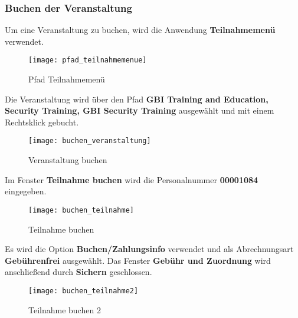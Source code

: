 \subsubsection{Buchen der Veranstaltung}
Um eine Veranstaltung zu buchen, wird die Anwendung \textbf{Teilnahmemenü} verwendet.
\begin{figure}[H]
	\centering
	\texttt{[image: pfad\_teilnahmemenue]}
	\caption{Pfad Teilnahmemenü}
	\label{fig:pfad_teilnahmemenue}
\end{figure}
Die Veranstaltung wird über den Pfad \textbf{GBI Training and Education, Security Training, GBI Security Training} ausgewählt und mit einem Rechtsklick gebucht.
\begin{figure}[H]
	\centering
	\texttt{[image: buchen\_veranstaltung]}
	\caption{Veranstaltung buchen}
	\label{fig:buchen_veranstaltung}
\end{figure}
Im Fenster \textbf{Teilnahme buchen} wird die Personalnummer \textbf{00001084} eingegeben.
\begin{figure}[H]
	\centering
	\texttt{[image: buchen\_teilnahme]}
	\caption{Teilnahme buchen}
	\label{fig:buchen_teilnahme}
\end{figure}
Es wird die Option \textbf{Buchen/Zahlungsinfo} verwendet und als Abrechnungsart \textbf{Gebührenfrei} ausgewählt. Das Fenster \textbf{Gebühr und Zuordnung} wird anschließend durch \textbf{Sichern} geschlossen. 
\begin{figure}[H]
	\centering
	\texttt{[image: buchen\_teilnahme2]}
	\caption{Teilnahme buchen 2}
	\label{fig:buchen_teilnahme2}
\end{figure}

